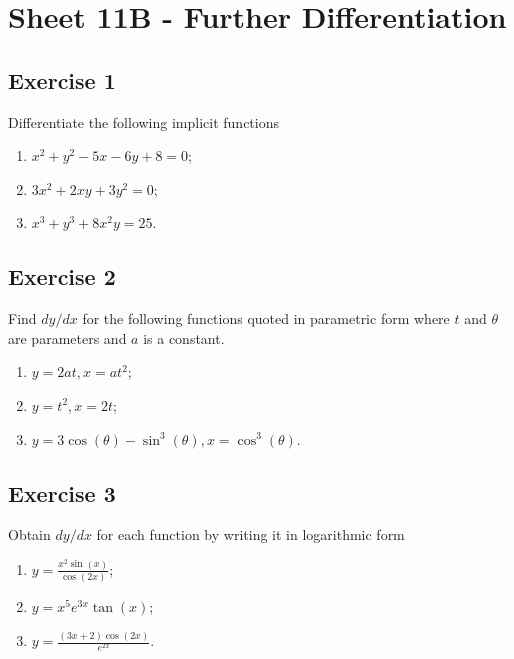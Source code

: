 \documentclass[
  11pt,
  oneside]{book}
\providecommand{\tightlist}{%
  \setlength{\itemsep}{0pt}\setlength{\parskip}{0pt}}
\newcommand{\slide}{}
\theoremstyle{definition}
\theoremstyle{definition}
\theoremstyle{definition}
\theoremstyle{definition}
\theoremstyle{remark}
\begin{document}
\section{Sheet 11B - Further Differentiation}\label{sheet-11b---further-differentiation}

\subsection*{Exercise 1}\label{exercise-1-5}

Differentiate the following implicit functions

\begin{enumerate}
\def\labelenumi{\arabic{enumi}.}
\tightlist
\item
  \(x^2+y^2-5x-6y+8=0\);
\item
  \(3x^2+2xy+3y^2=0\);
\item
  \(x^3+y^3+8x^2y=25\).
\end{enumerate}

\slide

\subsection*{Exercise 2}\label{exercise-2-5}

Find \(dy/dx\) for the following functions quoted in parametric form where \(t\) and \(\theta\) are parameters and \(a\) is a constant.

\begin{enumerate}
\def\labelenumi{\arabic{enumi}.}
\tightlist
\item
  \(y=2at, x = at^2\);
\item
  \(y=t^2, x = 2t\);
\item
  \(y=3\cos(\theta)-\sin^3(\theta), x = \cos^3(\theta)\).
\end{enumerate}

\slide

\subsection*{Exercise 3}\label{exercise-3-4}

Obtain \(dy/dx\) for each function by writing it in logarithmic form

\begin{enumerate}
\def\labelenumi{\arabic{enumi}.}
\tightlist
\item
  \(y=\frac{x^2\sin(x)}{\cos(2x)}\);
\item
  \(y=x^5e^{3x}\tan(x)\);
\item
  \(y=\frac{(3x+2)\cos(2x)}{e^{2x}}\).
\end{enumerate}
\end{document}
